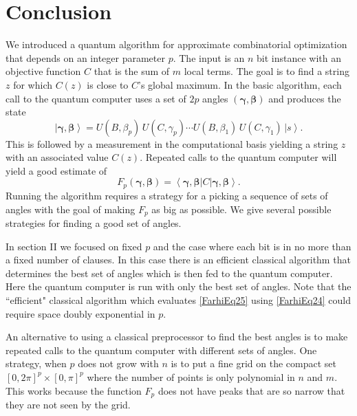 \documentclass[t11pt,reprint,preprint,preprintnumbers]{revtex4}
\newcommand{\bra}[1]{\left\langle #1 \right|}
\newcommand{\ket}[1]{\left|#1\right\rangle}
\begin{document}
\section{Conclusion}
We introduced a quantum algorithm for approximate combinatorial optimization that depends on an integer parameter $p$. The input is an $n$ bit instance with an objective function $C$ that is the sum of $m$ local terms.  The goal is to find a string $z$ for which $C(z)$ is close to $C$'s global maximum.  In the basic algorithm, each call to the quantum computer uses a set of $2p$ angles $(\boldsymbol{\gamma}, \boldsymbol{\beta})$ and produces the state 
\begin{equation}
\ket{\boldsymbol{\gamma}, \boldsymbol{\beta}} = U (B, \beta_p) \, U (C, \gamma_p) \cdots U (B, \beta_1) \, U (C, \gamma_1)\, \ket{s} .
\label{FarhiEq32}
\end{equation}
This is followed by a measurement in the computational basis yielding a string $z$ with an associated value $C(z)$.  Repeated calls to the quantum computer will yield a good estimate of 
\begin{equation}
F_p (\boldsymbol{\gamma}, \boldsymbol{\beta}) = \bra{\boldsymbol{\gamma}, \boldsymbol{\beta}} C  \ket{\boldsymbol{\gamma}, \boldsymbol{\beta}} .
\label{FarhiEq33}
\end{equation}
Running the algorithm requires a strategy for a picking a sequence of sets of angles with the goal of making $F_p$ as big as possible. We give several possible strategies for finding a good set of angles.

In section II we focused on fixed $p$ and the case where each bit is in no more than a fixed number of clauses.  In this case there is an efficient classical algorithm that determines the best set of angles which is then fed to the quantum computer.  Here the quantum computer is run with only the best set of angles. Note that the ``efficient" classical algorithm which  evaluates \eqref{FarhiEq25} using \eqref{FarhiEq24} could require space doubly exponential in $p$.

An alternative to using a classical preprocessor to find the best angles is to make repeated calls to the quantum computer with different sets of angles.  One strategy, when $p$ does not grow with $n$ is to put a fine grid on the compact set $[0,2\pi]^p \times [0 , \pi ] ^ {p}$ where the number of points is only polynomial in $n$ and $m$.  This works because the function $F_p$ does not have peaks that are so narrow that they are not seen by the grid.
\end{document}

